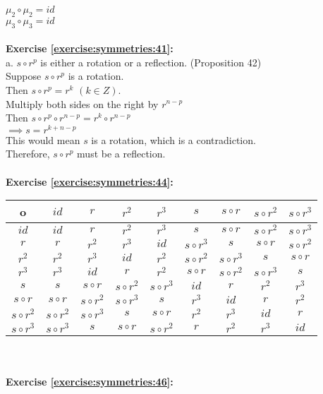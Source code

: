 $\mu_2\circ\mu_2=id$\\
$\mu_3\circ\mu_3=id$\\
\\
\textbf{Exercise \ref{exercise:symmetries:41}:}\\
a. $s\circ r^p$ is either a rotation or a reflection. (Proposition 42)\\
Suppose $s\circ r^p$ is a rotation.\\
Then $s\circ r^p=r^k$ $(k\in Z)$.\\
Multiply both sides on the right by $r^{n-p}$\\
Then $s\circ r^p\circ r^{n-p}=r^k\circ r^{n-p}$\\
$\implies s=r^{k+n-p}$\\
This would mean $s$ is a rotation, which is a contradiction.\\
Therefore, $s\circ r^p$ must be a reflection.\\
\\
\textbf{Exercise \ref{exercise:symmetries:44}:}\\
\begin{center}
	\begin{tabular}{c| c c c c c c c c }
		o & $id$ & $r$ & $r^2$ & $r^3$ & $s$ & $s\circ r$ & $s\circ r^2$ & $s\circ r^3$\\
		\hline
		$id$ & $id$ & $r$ & $r^2$ & $r^3$ & $s$ & $s\circ r$ & $s\circ r^2$ & $s\circ r^3$\\
		$r$ & $r$ & $r^2$ & $r^3$ & $id$ & $s\circ r^3$ & $s$ & $s\circ r$ & $s\circ r^2$\\
		$r^2$ & $r^2$ & $r^3$ & $id$ & $r^2$ & $s\circ r^2$ & $s\circ r^3$ & $s$ & $s\circ r$\\
		$r^3$ & $r^3$ & $id$ & $r$ & $r^2$ & $s\circ r$ & $s\circ r^2$ & $s\circ r^3$ & $s$\\
		$s$ & $s$ & $s\circ r$ & $s\circ r^2$ & $s\circ r^3$ & $id$ & $r$ & $r^2$ & $r^3$\\
		$s\circ r$ & $s\circ r$ & $s\circ r^2$ & $s\circ r^3$ & $s$ & $r^3$ & $id$ & $r$ & $r^2$\\
		$s\circ r^2$ & $s\circ r^2$ & $s\circ r^3$ & $s$ & $s\circ r$ & $r^2$ & $r^3$ & $id$ & $r$\\
		$s\circ r^3$ & $s\circ r^3$ & $s$ & $s\circ r$ & $s\circ r^2$ & $r$ & $r^2$ & $r^3$ & $id$
	\end{tabular}
\end{center}
\hfill\\
\hfill\\
\textbf{Exercise \ref{exercise:symmetries:46}:}\\
